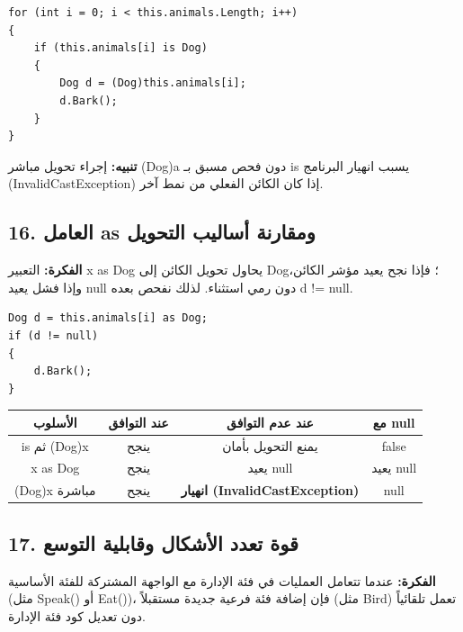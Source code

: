 \documentclass[14pt]{extarticle}
\begin{document}
\begin{boxCode}
\begin{english}
\begin{verbatim}
for (int i = 0; i < this.animals.Length; i++)
{
    if (this.animals[i] is Dog)
    {
        Dog d = (Dog)this.animals[i];
        d.Bark();
    }
}
\end{verbatim}
\end{english}
\end{boxCode}

\textbf{تنبيه:} إجراء تحويل مباشر \textenglish{(Dog)a} دون فحص مسبق بـ \textenglish{is} يسبب انهيار البرنامج (\textenglish{InvalidCastException}) إذا كان الكائن الفعلي من نمط آخر.

\filbreak
\subsection*{16. العامل \textenglish{as} ومقارنة أساليب التحويل}
\textbf{الفكرة:} التعبير \textenglish{x as Dog} يحاول تحويل الكائن إلى \textenglish{Dog}؛ فإذا نجح يعيد مؤشر الكائن، وإذا فشل يعيد \textenglish{null} دون رمي استثناء. لذلك نفحص بعده \textenglish{d != null}.

\begin{boxCode}
\begin{english}
\begin{verbatim}
Dog d = this.animals[i] as Dog;
if (d != null)
{
    d.Bark();
}
\end{verbatim}
\end{english}
\end{boxCode}

\begin{center}
\renewcommand{\arraystretch}{1.2}
{\small
\begin{tabular}{|c|c|c|c|}
\hline
\textbf{الأسلوب} & \textbf{عند التوافق} & \textbf{عند عدم التوافق} & \textbf{مع \textenglish{null}} \\
\hline
\textenglish{is} ثم \textenglish{(Dog)x} & ينجح & يمنع التحويل بأمان & \textenglish{false} \\
\hline
\textenglish{x as Dog} & ينجح & يعيد \textenglish{null} & يعيد \textenglish{null} \\
\hline
\textenglish{(Dog)x} مباشرة & ينجح & \textbf{انهيار (\textenglish{InvalidCastException})} & \textenglish{null} \\
\hline
\end{tabular}
}
\end{center}

\filbreak
\subsection*{17. قوة تعدد الأشكال وقابلية التوسع}
\textbf{الفكرة:} عندما تتعامل العمليات في فئة الإدارة مع الواجهة المشتركة للفئة الأساسية (مثل \textenglish{Speak()} أو \textenglish{Eat()})، فإن إضافة فئة فرعية جديدة مستقبلاً (مثل \textenglish{Bird}) تعمل تلقائياً دون تعديل كود فئة الإدارة.
\end{document}
